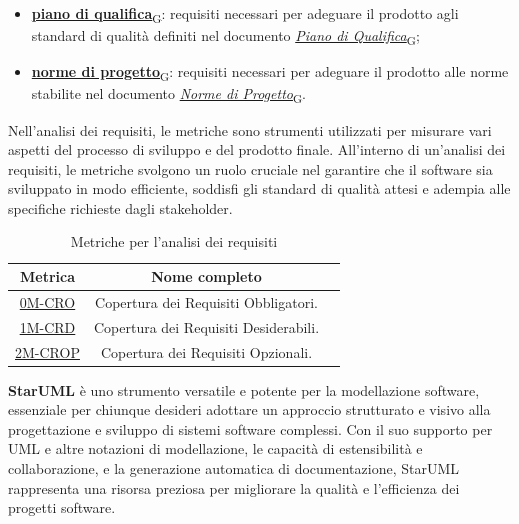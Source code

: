 \begin{enumerate}
\begin{itemize}
		      \item \href{https://7last.github.io/docs/rtb/documentazione-interna/glossario\#piano-di-qualifica}{\textbf{piano di qualifica}\textsubscript{G}}: requisiti necessari per adeguare il prodotto agli standard di qualità definiti nel documento \href{https://7last.github.io/docs/rtb/documentazione-interna/glossario\#piano-di-qualifica}{\textit{Piano di Qualifica}\textsubscript{G}};
		      \item \href{https://7last.github.io/docs/rtb/documentazione-interna/glossario\#norme-di-progetto}{\textbf{norme di progetto}\textsubscript{G}}: requisiti necessari per adeguare il prodotto alle norme stabilite nel documento \href{https://7last.github.io/docs/rtb/documentazione-interna/glossario\#norme-di-progetto}{\textit{Norme di Progetto}\textsubscript{G}}.
	      \end{itemize}
\end{enumerate}


Nell'analisi dei requisiti, le metriche sono strumenti utilizzati per misurare vari aspetti del processo di sviluppo e del prodotto finale. All'interno di un'analisi dei requisiti, le metriche svolgono un ruolo cruciale nel garantire che il software sia sviluppato in modo efficiente, soddisfi gli standard di qualità attesi e adempia alle specifiche richieste dagli stakeholder.\\
\begin{table}[!h] %
	\centering
	\begin{tabular}{|c|c|c|}
		\hline
		\textbf{Metrica}                    & \textbf{Nome completo}\\
		\hline
		\hyperlink{subsection.6.2}{0M-CRO}  & Copertura dei Requisiti Obbligatori. \\
		\hyperlink{subsection.6.2}{1M-CRD}  & Copertura dei Requisiti Desiderabili. \\
		\hyperlink{subsection.6.2}{2M-CROP} & Copertura dei Requisiti Opzionali. \\
		\hline
	\end{tabular}
	\caption{Metriche per l'analisi dei requisiti}
	\label{tab:1}
\end{table}

\textbf{StarUML} è uno strumento versatile e potente per la modellazione software, essenziale per chiunque desideri adottare un approccio strutturato e visivo alla progettazione e sviluppo di sistemi software complessi. Con il suo supporto per UML e altre notazioni di modellazione, le capacità di estensibilità e collaborazione, e la generazione automatica di documentazione, StarUML rappresenta una risorsa preziosa per migliorare la qualità e l'efficienza dei progetti software.\\

